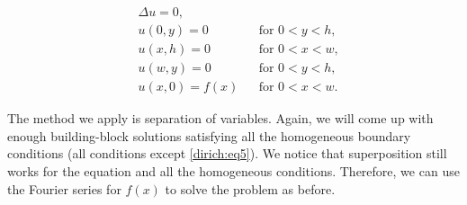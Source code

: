 
\begin{center}
\begin{minipage}[b]{2.8in}
\vspace{\fill}
\begin{align}
& \Delta u = 0 , & &  \label{dirich:eq1} \\
& u(0,y) = 0 & & \text{for }  0 < y < h,\label{dirich:eq2} \\
& u(x,h) = 0 & & \text{for }  0 < x < w,\label{dirich:eq3} \\
& u(w,y) = 0 & & \text{for }  0 < y < h,\label{dirich:eq4} \\
& u(x,0) = f(x) & & \text{for }  0 < x < w.\label{dirich:eq5}
\end{align}
\vspace{\fill}
\end{minipage}
\qquad
\qquad
\end{center}

The method we apply is separation of variables.  Again, we will
come up with enough building-block
solutions satisfying all the homogeneous boundary conditions
(all conditions except \eqref{dirich:eq5}).  We notice that superposition
still works for the equation and all the homogeneous conditions.
Therefore,
we can use the Fourier series for $f(x)$ to solve the
problem as before.

